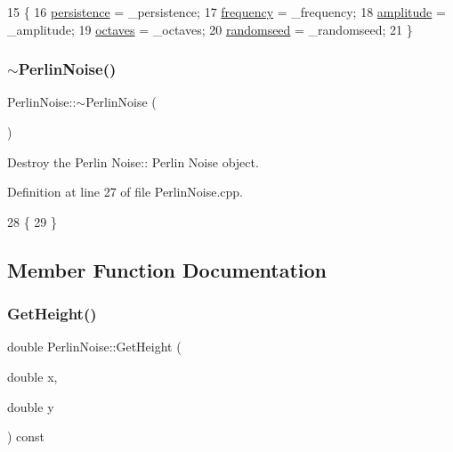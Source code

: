 \begin{DoxyCode}
15 \{
16     \mbox{\hyperlink{class_perlin_noise_aeb01e2c26e1b3c87fcbe1a1e0bc28881}{persistence}} = \_persistence;
17     \mbox{\hyperlink{class_perlin_noise_a5e0b39e0cf38d292f0c92a428ecc56fc}{frequency}} = \_frequency;
18     \mbox{\hyperlink{class_perlin_noise_a61323596df1daa4a56f057a43f9c12ba}{amplitude}} = \_amplitude;
19     \mbox{\hyperlink{class_perlin_noise_a1098ffa60dc53802b509e57e6d96c072}{octaves}} = \_octaves;
20     \mbox{\hyperlink{class_perlin_noise_a012846debd95e4cc158600fa381810d9}{randomseed}} = \_randomseed;
21 \}
\end{DoxyCode}
\mbox{\label{class_perlin_noise_a39f323fb44aaf9a9e4450ef49798117a}} 
\subsubsection{\texorpdfstring{$\sim$\+Perlin\+Noise()}{~PerlinNoise()}}
{\footnotesize\ttfamily Perlin\+Noise\+::$\sim$\+Perlin\+Noise (\begin{DoxyParamCaption}{ }\end{DoxyParamCaption})}



Destroy the Perlin Noise\+:\+: Perlin Noise object. 



Definition at line 27 of file Perlin\+Noise.\+cpp.


\begin{DoxyCode}
28 \{
29 \}
\end{DoxyCode}


\subsection{Member Function Documentation}
\mbox{\label{class_perlin_noise_a1eea20ff062778d6668b32f1d75a8e2a}} 
\subsubsection{\texorpdfstring{Get\+Height()}{GetHeight()}}
{\footnotesize\ttfamily double Perlin\+Noise\+::\+Get\+Height (\begin{DoxyParamCaption}\item[{double}]{x,  }\item[{double}]{y }\end{DoxyParamCaption}) const}



